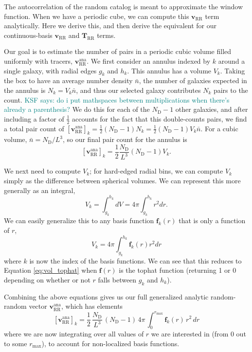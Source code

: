\documentclass[modern]{aastex62}
\newcommand{\bld}[1]{\bm{#1}} %
\newcommand{\vv}[1]{\bld{v}_\mathrm{#1}}
\newcommand{\TT}[1]{\bld{T}_\mathrm{#1}}
\newcommand{\ff}{\bld{f}}
\newcommand{\NN}[1]{N_\mathrm{#1}}
\newcommand{\KSF}[1]{\textcolor{teal}{KSF says: #1}}
\begin{document}
The autocorrelation of the random catalog is meant to approximate the window function. 
When we have a periodic cube, we can compute this $\vv{RR}$ term analytically.
Here we derive this, and then derive the equivalent for our continuous-basis $\vv{RR}$ and $\TT{RR}$ terms.

Our goal is to estimate the number of pairs in a periodic cubic volume filled uniformly with tracers, $\vv{RR}^\mathrm{ana}$. 
We first consider an annulus indexed by $k$ around a single galaxy, with radial edges $g_k$ and $h_k$. 
This annulus has a volume $V_k$.
Taking the box to have an average number density $\bar{n}$, the number of galaxies expected in the annulus is $N_k = V_k \bar{n}$, and thus our selected galaxy contributes $N_k$ pairs to the count.   
\KSF{do i put mathspaces between multiplications when there's already a parenthesis?}
We do this for each of the $\NN{D}-1$ other galaxies, and after including a factor of $\frac{1}{2}$ accounts for the fact that this double-counts pairs, we find a total pair count of $\left[ \vv{RR}^\mathrm{ana} \right]_k = \frac{1}{2}(\NN{D}-1) N_k = \frac{1}{2}(\NN{D}-1) V_k \bar{n}$.
For a cubic volume, $\bar{n} = \NN{D}/L^3$, so our final pair count for the annulus is 
\begin{equation}
\left[ \vv{RR}^\mathrm{ana} \right]_k = \frac{1}{2} \frac{\NN{D}}{L^3} (\NN{D}-1) V_k.
\end{equation}

We next need to compute $V_k$; for hard-edged radial bins, we can compute $V_k$ simply as the difference between spherical volumes. 
We can represent this more generally as an integral,
\begin{equation} \label{eq:vol_tophat}
V_k = \int_{g_k}^{h_k} dV = 4\pi \int_{g_k}^{h_k} r^2 dr.
\end{equation}
We can easily generalize this to any basis function $\ff_k(r)$ that is only a function of $r$,
\begin{equation}
V_k = 4\pi  \int_{g_k}^{h_k} \ff_k(r) r^2 dr
\end{equation}
where $k$ is now the index of the basis functions.
We can see that this reduces to Equation \ref{eq:vol_tophat} when $\ff(r)$ is the tophat function (returning 1 or 0 depending on whether or not $r$ falls between $g_k$ and $h_k$).

Combining the above equations gives us our full generalized analytic random-random vector $\vv{RR}^\mathrm{ana}$, which has elements
\begin{equation}
\left[ \vv{RR}^\mathrm{ana} \right]_k = \frac{1}{2} \, \frac{\NN{D}}{L^3} \,(\NN{D}-1) \, 4\pi \, \int_{0}^{r_\mathrm{max}} \ff_k(r) \, r^2 \, dr
\end{equation}
where we are now integrating over all values of $r$ we are interested in (from 0 out to some $r_\mathrm{max}$), to account for non-localized basis functions. 
\end{document}
